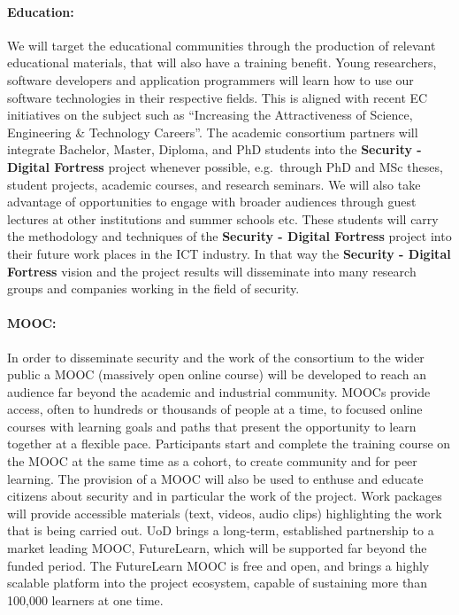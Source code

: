 \documentclass[a4paper,11pt]{article}
\newcommand{\project}[1]{\textbf{#1}\xspace}
\newcommand{\SECURITY}{\project{Security - Digital Fortress}}
\newcommand{\TheProject}{\SECURITY}
\begin{document}
\paragraph{Education:} We will target 
the educational communities through the production of relevant educational materials, that will
also have a training benefit. Young researchers, software
 developers and application programmers will learn how to
 use our software technologies in their
 respective fields. This is aligned with recent EC
 initiatives on the subject such as ``Increasing the Attractiveness
 of Science, Engineering \& Technology Careers''.
 The academic consortium partners will integrate Bachelor,
 Master, Diploma, and PhD students into the \TheProject{}
 project whenever possible, e.g.~through PhD and MSc theses, student
 projects, academic courses, and research seminars. 
 We will also take advantage of opportunities to engage with broader
 audiences through guest lectures at other institutions and summer schools etc.
 These students will
 carry the methodology and techniques of the \TheProject{}
 project into their future work places in the ICT industry.
 In that way the \TheProject{} vision and the project
 results will disseminate into many research groups and
 companies working in the field of security. 
 \paragraph{MOOC:}In order to disseminate security and the work of the consortium to the wider public a MOOC (massively open online course) will be developed to reach an audience far beyond the academic and industrial community.  MOOCs provide access, often to hundreds or thousands of people at a time, to focused online courses with learning goals and paths that present the opportunity to learn together at a flexible pace. Participants start and complete the training course on the MOOC at the same time as a cohort, to create community and for peer learning. The provision of a MOOC will also be
used to enthuse and educate citizens about security and in particular the work of the project.  Work packages will provide accessible materials (text, videos, audio clips) highlighting the work that is being carried out. UoD brings a long‐term, established partnership to a market leading MOOC, FutureLearn, which will be supported far beyond the funded period. The FutureLearn MOOC is free and open, and brings a highly scalable platform into the project ecosystem, capable of sustaining more than 100,000 learners at one time.
\end{document}
